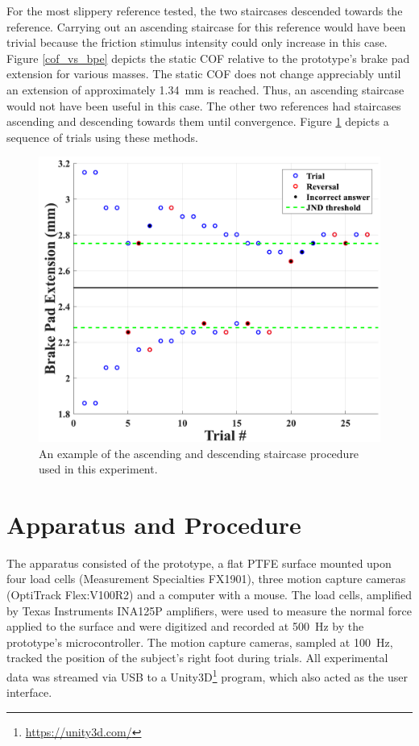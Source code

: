 \documentclass [12pt,letterpaper]{report}
\begin{document}
For the most slippery reference tested, the two staircases descended towards the reference. Carrying out an ascending staircase for this reference would have been trivial because the friction stimulus intensity could only increase in this case. Figure \ref{cof_vs_bpe} depicts the static COF relative to the prototype's brake pad extension for various masses. The static COF does not change appreciably until an extension of approximately 1.34~mm is reached. Thus, an ascending staircase would not have been useful in this case. The other two references had staircases ascending and descending towards them until convergence. Figure \ref{stairway} depicts a sequence of trials using these methods.

\begin{figure}[tpb]
  \centering
  \includegraphics[scale=0.4]{fig/stairway}
  \caption{An example of the ascending and descending staircase procedure used in this experiment.}
  \label{stairway}
\end{figure}


\section{Apparatus and Procedure}

The apparatus consisted of the prototype, a flat PTFE surface mounted upon four load cells (Measurement Specialties FX1901), three motion capture cameras (OptiTrack Flex:V100R2) and a computer with a mouse. The load cells, amplified by Texas Instruments INA125P amplifiers, were used to measure the normal force applied to the surface and were digitized and recorded at 500~Hz by the prototype's microcontroller. The motion capture cameras, sampled at 100~Hz, tracked the position of the subject's right foot during trials. All experimental data was streamed via USB to a Unity3D\footnote{\url{https://unity3d.com/}} program, which also acted as the user interface.
\end{document}
